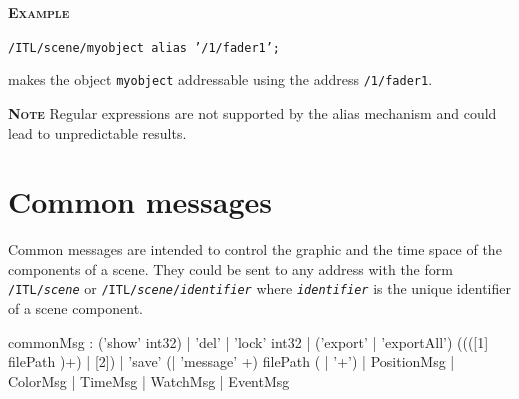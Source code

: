 \documentclass[a4paper,twoside]{report}
\newcommand{\toplevel}[1]	{\chapter{#1}}
\newcommand{\OSC}[1]		{\texttt{#1}}
\newcommand{\example}		{\textbf{\hspace{-1.5cm}\textbf{\textsc{Example }}}}
\newcommand{\note}	[1]		{\vspace{2mm}\textbf{\hspace{-0.9cm}\textbf{\textsc{Note #1}}}}
\newcommand{\sample}	[1]			{\vspace{-2mm}\begin{center}\colorbox{mygrey}{
								\begin{minipage}[t]{0.9\columnwidth} 
								{\small \texttt{#1}}
								\end{minipage}}\end{center}}
\newcommand{\sampleindent}	{ \hspace{0.5cm} }
\begin{document}
\example
\sample{/ITL/scene/myobject alias '/1/fader1';}
\sampleindent makes the object \OSC{myobject} addressable using the address \OSC{/1/fader1}.

\note{} Regular expressions are not supported by the alias mechanism and could lead to unpredictable results.



\toplevel{Common messages}
\label{common}
Common messages are intended to control the graphic and the time space of the components of a scene.
They could be sent to any address with the form \OSC{/ITL/\textit{scene}} or \OSC{/ITL/\textit{scene}/\textit{identifier}} where \OSC{\textit{identifier}} is the unique identifier of a scene component.
\begin{rail}
commonMsg :  ('show' int32)
			| 'del'
			| 'lock' int32
			| ('export' | 'exportAll') ((([1] filePath )+) | [2])
			| 'save' (| 'message' +) filePath ( | '+')
			| PositionMsg
			| ColorMsg
			| TimeMsg
			| WatchMsg
			| EventMsg
\end{rail}
\end{document}
